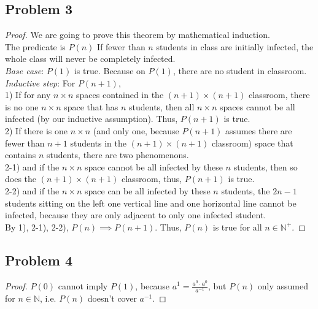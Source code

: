\documentclass{article}
\begin{document}
\subsection{Problem 3}
\begin{proof}
We are going to prove this theorem by mathematical induction.
\\The predicate is $P(n)$ If fewer than $n$ students in class are initially infected, the whole class will never be completely infected.
\\ \textit{Base case}: $P(1)$ is true. Because on $P(1)$, there are no student in classroom.
\\ \textit{Inductive step}: For $P(n+1)$,
\\ 1) If for any $n \times n$ spaces contained in the $(n+1)\times(n+1)$ classroom, there is no one $n \times n$ space that has $n$ students, then all $n \times n$ spaces cannot be all infected (by our inductive assumption). Thus, $P(n+1)$ is true.
\\ 2) If there is one $n \times n$ (and only one, because $P(n+1)$ assumes there are fewer than $n+1$ students in the $(n+1)\times(n+1)$ classroom) space that contains $n$ students, there are two phenomenons.
\\ 2-1) and if the $n \times n$ space cannot be all infected by these $n$ students, then so does the $(n+1) \times (n+1)$ classroom, thus, $P(n+1)$ is true.
\\ 2-2) and if the $n \times n$ space can be all infected by these $n$ students, the $2n-1$ students sitting on the left one vertical line and one horizontal line cannot be infected, because they are only adjacent to only one infected student.
\\ By 1), 2-1), 2-2), $P(n) \implies P(n+1)$. Thus, $P(n)$ is true for all $n \in \mathbb{N}^+$.
\end{proof}
\subsection{Problem 4}
\begin{proof}
$P(0)$ cannot imply $P(1)$, because $a^1 = \frac{a^0 \cdot a^0}{a^{-1}}$, but $P(n)$ only assumed for $n \in \mathbb{N}$, i.e. $P(n)$ doesn't cover $a^{-1}$.
\end{proof}
\end{document}
